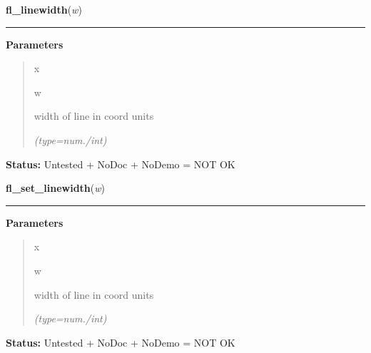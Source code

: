 \hspace{.8\funcindent}\begin{boxedminipage}{\funcwidth}

    \raggedright \textbf{fl\_linewidth}(\textit{w})

    \vspace{-1.5ex}

    \rule{\textwidth}{0.5\fboxrule}
\setlength{\parskip}{2ex}
\setlength{\parskip}{1ex}
      \textbf{Parameters}
      \vspace{-1ex}

      \begin{quote}
        \begin{Ventry}{x}

          \item[w]

          width of line in coord units

            {\it (type=num./int)}

        \end{Ventry}

      \end{quote}

\textbf{Status:} Untested + NoDoc + NoDemo = NOT OK



    \end{boxedminipage}

    \label{xformslib:library:fl_linewidth}

    \vspace{0.5ex}

\hspace{.8\funcindent}\begin{boxedminipage}{\funcwidth}

    \raggedright \textbf{fl\_set\_linewidth}(\textit{w})

    \vspace{-1.5ex}

    \rule{\textwidth}{0.5\fboxrule}
\setlength{\parskip}{2ex}
\setlength{\parskip}{1ex}
      \textbf{Parameters}
      \vspace{-1ex}

      \begin{quote}
        \begin{Ventry}{x}

          \item[w]

          width of line in coord units

            {\it (type=num./int)}

        \end{Ventry}

      \end{quote}

\textbf{Status:} Untested + NoDoc + NoDemo = NOT OK



    \end{boxedminipage}

